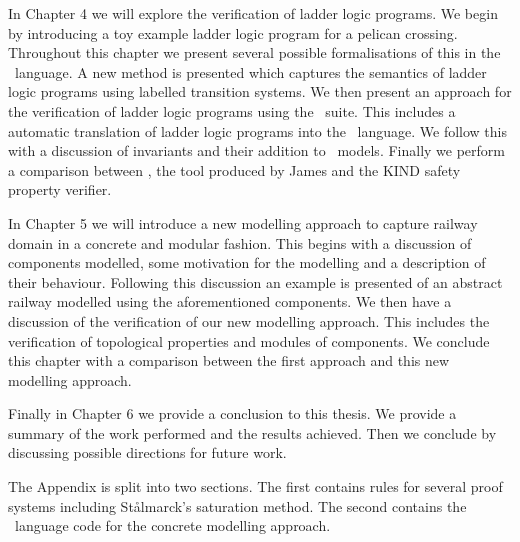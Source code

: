 In Chapter 4 we will explore the verification of ladder logic programs. We
begin by introducing a toy example ladder logic program for a pelican
crossing. Throughout this chapter we present several possible formalisations of
this in the \scade \ language. A new method is presented which captures the semantics of
ladder logic programs using labelled transition systems. We then present an approach for the
verification of ladder logic programs using the \scade \ suite. This includes a
automatic translation of ladder logic programs into the \scade \
language. We follow this with a discussion of invariants and their addition to
\scade \ models. Finally we perform a comparison between \scade, the tool
produced by James \cite{PJames} and the KIND safety property verifier.

In Chapter 5 we will introduce a new modelling approach to capture railway
domain in  a concrete and modular fashion. This begins with a discussion of
components modelled, some motivation for the modelling and a description of
their behaviour. Following this discussion an example is presented of an
abstract railway modelled using the aforementioned components.  We then have a 
discussion of the verification of our new modelling approach. This includes the
verification of topological properties and modules of components. We conclude
this chapter with a comparison between the first approach and this new
modelling approach. 

Finally in Chapter 6 we provide a conclusion to this thesis. We provide a
summary of the work performed and the results achieved. Then we conclude by
discussing possible directions for future work.

The Appendix is split into two sections. The first contains rules for several proof systems including
St{\aa}lmarck's saturation method. The second contains the \scade \ language
code for the concrete modelling approach.
